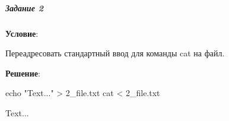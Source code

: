 \subparagraph{Задание 2} \textbf{Условие}:

Переадресовать стандартный ввод для команды cat на файл.

\textbf{Решение}:

\begin{BashBox}
echo "Text..." > 2_file.txt
cat < 2_file.txt
\end{BashBox}

\begin{OutBox}
Text...
\end{OutBox}
